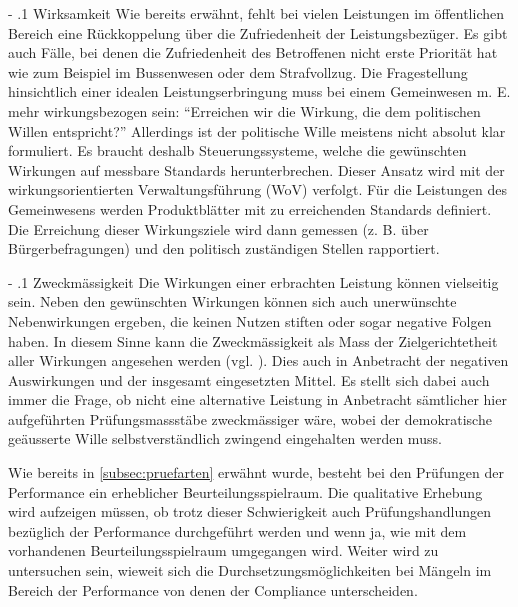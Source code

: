 \documentclass[10pt]{article}
\makeatletter
\renewcommand\paragraph{\@startsection{paragraph}{3}{0mm}{-\baselineskip}{.1\baselineskip}{\normalfont\normalsize\bfseries}}
\renewcommand\paragraph{%
\@startsection{paragraph}{3}{0mm}%
{-\baselineskip}%
{.1\baselineskip}%
{\normalfont\normalsize\bfseries}}
\makeatother
\begin{document}
\paragraph{Wirksamkeit}\label{para:wirksamkeit}
Wie bereits erwähnt, fehlt bei vielen Leistungen im öffentlichen Bereich eine Rückkoppelung über die Zufriedenheit der Leistungsbezüger. Es gibt auch Fälle, bei denen die Zufriedenheit des Betroffenen nicht erste Priorität hat wie zum Beispiel im Bussenwesen oder dem Strafvollzug. Die Fragestellung hinsichtlich einer idealen Leistungserbringung muss bei einem Gemeinwesen m. E. mehr wirkungsbezogen sein: “{}Erreichen wir die Wirkung, die dem politischen Willen entspricht?”{} Allerdings ist der politische Wille meistens nicht absolut klar formuliert. Es braucht deshalb Steuerungssysteme, welche die gewünschten Wirkungen auf messbare Standards herunterbrechen. Dieser Ansatz wird mit der wirkungsorientierten Verwaltungsführung (WoV) verfolgt. Für die Leistungen des Gemeinwesens werden Produktblätter mit zu erreichenden Standards definiert. Die Erreichung dieser Wirkungsziele wird dann gemessen (z. B. über Bürgerbefragungen) und den politisch zuständigen Stellen rapportiert.

\paragraph{Zweckmässigkeit}\label{para:zweckmaessigkeit}
Die Wirkungen einer erbrachten Leistung können vielseitig sein. Neben den gewünschten Wirkungen können sich auch unerwünschte Nebenwirkungen ergeben, die keinen Nutzen stiften oder sogar negative Folgen haben. In diesem Sinne kann die Zweckmässigkeit als Mass der Zielgerichtetheit aller Wirkungen angesehen werden (vgl. \cite[2231]{Theisen2006}). Dies auch in Anbetracht der negativen Aus­wir­kungen und der insgesamt eingesetzten Mittel. Es stellt sich dabei auch immer die Frage, ob nicht eine alternative Leistung in Anbetracht sämtlicher hier aufgeführten Prüfungsmassstäbe zweckmässiger wäre, wobei der demokratische geäusserte Wille selbstverständlich zwingend eingehalten werden muss.

Wie bereits in \vref{subsec:pruefarten} erwähnt wurde, besteht bei den Prüfungen der Performance ein erheblicher Beurteilungsspielraum. Die qualitative Erhebung wird aufzeigen müssen, ob trotz dieser Schwierigkeit auch Prüfungshandlungen bezüglich der Performance durchgeführt werden und wenn ja, wie mit dem vorhandenen Beurteilungsspielraum umgegangen wird. Weiter wird zu untersuchen sein, wieweit sich die Durchsetzungsmöglichkeiten bei Mängeln im Bereich der Performance von denen der Compliance unterscheiden.
\end{document}
